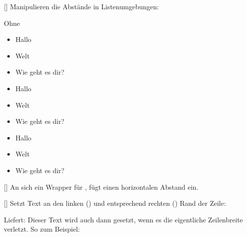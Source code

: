 [\cmdlist{}]
Manipulieren die Abstände in Listenumgebungen:
\begin{center}
    \parbox{0.33\linewidth}{%
        {\centering Ohne \par}
        {\begin{itemize}
            \item Hallo
            \item Welt
            \item Wie geht es dir?
        \end{itemize}}
    }\parbox{0.33\linewidth}{%
        {\centering {} \par}
        {\begin{itemize}\narrowitems
            \item Hallo
            \item Welt
            \item Wie geht es dir?
        \end{itemize}}
    }\parbox{0.33\linewidth}{%
        {\centering {} \par}
        {\begin{itemize}\closeritems
            \item Hallo
            \item Welt
            \item Wie geht es dir?
        \end{itemize}}
    }
\end{center}

%
%
%

[]
An sich ein Wrapper für , fügt einen horizontalen \tab Abstand ein.

%
%
%

[\cmdold]
Setzt Text an den linken () und entsprechend rechten () Rand der Zeile:
\begin{latex*}
\end{latex*}
Liefert:\newline{}\newline
Dieser Text wird auch dann gesetzt, wenn es die eigentliche Zeilenbreite verletzt. \newline
So zum Beispiel:

%
%
%

